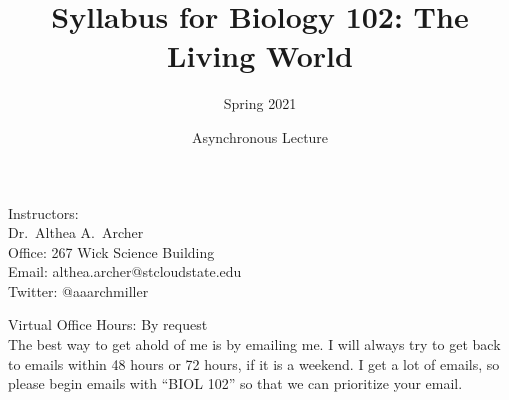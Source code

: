 \documentclass{tufte-handout}
\title{Syllabus for Biology 102: The Living World}										%
\author{Spring 2021}								%
\date{Asynchronous Lecture}
\begin{document}
\maketitle

Instructors:  \\
Dr.~Althea A.~Archer\\
Office: 267 Wick Science Building\\
Email: althea.archer@stcloudstate.edu\\
Twitter: @aaarchmiller

Virtual Office Hours: By request\\


 The best way to get ahold of me is by emailing me. I will always try to get back to emails within 48 hours or 72 hours, if it is a weekend. I get a lot of emails, so please begin emails with ``BIOL 102'' so that we can prioritize your email. 
\end{document}
